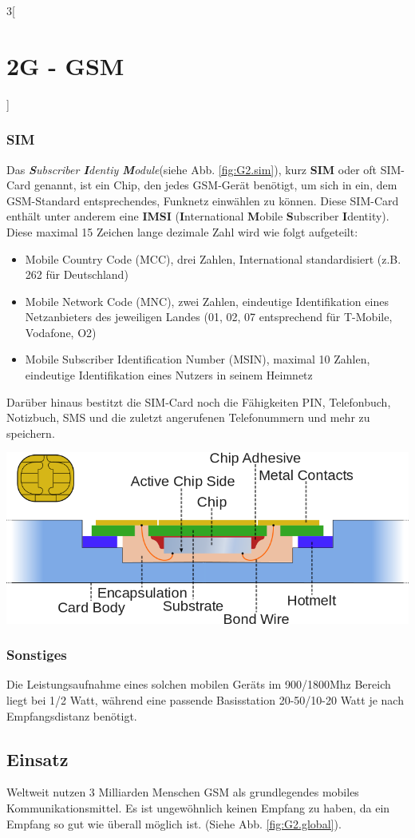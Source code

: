 \begin{multicols}{3}[\section{2G - GSM}]
\subsubsection*{SIM}
Das \textit{\textbf{S}ubscriber \textbf{I}dentiy \textbf{M}odule}(siehe Abb. \ref{fig:G2.sim}), kurz \textbf{SIM} oder oft SIM-Card genannt, ist ein Chip, den jedes GSM-Gerät benötigt, um sich in ein, dem GSM-Standard entsprechendes, Funk\-netz einwählen zu können. Diese SIM-Card enthält unter anderem eine \textbf{IMSI} (\textbf{I}nternational \textbf{M}obile \textbf{S}ubscriber \textbf{I}dentity). Diese maximal 15 Zeichen lange dezimale Zahl wird wie folgt aufgeteilt:
\begin{itemize}
	\item Mobile Country Code (MCC), drei Zahlen, International standardisiert (z.B. 262 für Deutschland)
	\item Mobile Network Code (MNC), zwei Zahlen, eindeutige Identifikation eines Netzanbieters des jeweiligen Landes (01, 02, 07 entsprechend für T-Mobile, Vodafone, O2)
	\item Mobile Subscriber Identification Number (MSIN), maximal 10 Zahlen, eindeutige Identifikation eines Nutzers in seinem Heimnetz
\end{itemize}
Darüber hinaus bestitzt die SIM-Card noch die Fähigkeiten PIN, Telefonbuch, Notizbuch, SMS und die zuletzt angerufenen Telefonummern und mehr zu speichern.\cite{G2.1}
\begin{Figure}
\includegraphics[width=\linewidth]{Kapitel/2G/Grafiken/GSM-SIM.png}
\label{fig:G2.sim}
\end{Figure}
\subsubsection*{Sonstiges}
Die Leistungsaufnahme eines solchen mobilen Geräts im 900/1800Mhz Bereich liegt bei 1/2 Watt, während eine passende Basisstation 20-50/10-20 Watt je nach Empfangsdistanz benötigt.\cite{G2.2}
\subsection*{Einsatz}
Weltweit nutzen 3 Milliarden Menschen GSM als grundlegendes mobiles Kommunikationsmittel. Es ist ungewöhnlich keinen Empfang zu haben, da ein Empfang so gut wie überall möglich ist. (Siehe Abb. \ref{fig:G2.global}).
\end{multicols}
\newpage
